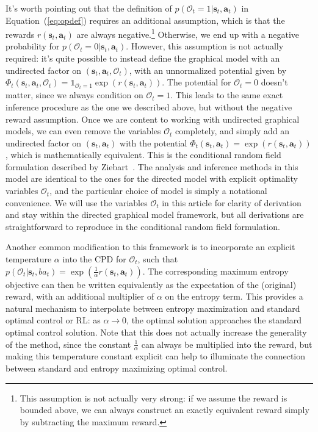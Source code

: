 It's worth pointing out that the definition of $p(\mathcal{O}_t = 1 | \mathbf{s}_t, \mathbf{a}_t)$ in Equation~(\ref{eq:opdef}) requires an additional assumption, which is that the rewards $r(\mathbf{s}_t,\mathbf{a}_t)$ are always negative.\footnote{This assumption is not actually very strong: if we assume the reward is bounded above, we can always construct an exactly equivalent reward simply by subtracting the maximum reward.} Otherwise, we end up with a negative probability for $p(\mathcal{O}_t = 0 | \mathbf{s}_t, \mathbf{a}_t)$. However, this assumption is not actually required: it's quite possible to instead define the graphical model with an undirected factor on $(\mathbf{s}_t,\mathbf{a}_t,\mathcal{O}_t)$, with an unnormalized potential given by $\Phi_t(\mathbf{s}_t,\mathbf{a}_t,\mathcal{O}_t) = \mathds{1}_{\mathcal{O}_t = 1}\exp(r(\mathbf{s}_t,\mathbf{a}_t))$. The potential for $\mathcal{O}_t = 0$ doesn't matter, since we always condition on $\mathcal{O}_t = 1$. This leads to the same exact inference procedure as the one we described above, but without the negative reward assumption. Once we are content to working with undirected graphical models, we can even remove the variables $\mathcal{O}_t$ completely, and simply add an undirected factor on $(\mathbf{s}_t,\mathbf{a}_t)$ with the potential $\Phi_t(\mathbf{s}_t,\mathbf{a}_t) = \exp(r(\mathbf{s}_t,\mathbf{a}_t))$, which is mathematically equivalent. This is the conditional random field formulation described by Ziebart~\citep{ziebart_thesis}. The analysis and inference methods in this model are identical to the ones for the directed model with explicit optimality variables $\mathcal{O}_t$, and the particular choice of model is simply a notational convenience. We will use the variables $\mathcal{O}_t$ in this article for clarity of derivation and stay within the directed graphical model framework, but all derivations are straightforward to reproduce in the conditional random field formulation.

Another common modification to this framework is to incorporate an explicit temperature $\alpha$ into the CPD for $\mathcal{O}_t$, such that $p(\mathcal{O}_t|\mathbf{s}_t,ba_t) = \exp(\frac{1}{\alpha} r(\mathbf{s}_t,\mathbf{a}_t))$. The corresponding maximum entropy objective can then be written equivalently as the expectation of the (original) reward, with an additional multiplier of $\alpha$ on the entropy term. This provides a natural mechanism to interpolate between entropy maximization and standard optimal control or RL: as $\alpha \rightarrow 0$, the optimal solution approaches the standard optimal control solution. Note that this does not actually increase the generality of the method, since the constant $\frac{1}{\alpha}$ can always be multiplied into the reward, but making this temperature constant explicit can help to illuminate the connection between standard and entropy maximizing optimal control.

